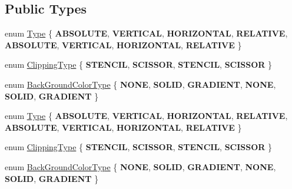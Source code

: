 \subsection*{Public Types}
\begin{DoxyCompactItemize}
\item 
enum \hyperlink{classui_1_1Layout_aecabbc1592677eadd6757edc1df5b952}{Type} \{ \newline
{\bfseries A\+B\+S\+O\+L\+U\+TE}, 
{\bfseries V\+E\+R\+T\+I\+C\+AL}, 
{\bfseries H\+O\+R\+I\+Z\+O\+N\+T\+AL}, 
{\bfseries R\+E\+L\+A\+T\+I\+VE}, 
\newline
{\bfseries A\+B\+S\+O\+L\+U\+TE}, 
{\bfseries V\+E\+R\+T\+I\+C\+AL}, 
{\bfseries H\+O\+R\+I\+Z\+O\+N\+T\+AL}, 
{\bfseries R\+E\+L\+A\+T\+I\+VE}
 \}
\item 
enum \hyperlink{classui_1_1Layout_acd2a398e83d7d467e9565d4db171c865}{Clipping\+Type} \{ {\bfseries S\+T\+E\+N\+C\+IL}, 
{\bfseries S\+C\+I\+S\+S\+OR}, 
{\bfseries S\+T\+E\+N\+C\+IL}, 
{\bfseries S\+C\+I\+S\+S\+OR}
 \}
\item 
enum \hyperlink{classui_1_1Layout_a2aad69f15823c5f22d8ed72bf2ac7472}{Back\+Ground\+Color\+Type} \{ \newline
{\bfseries N\+O\+NE}, 
{\bfseries S\+O\+L\+ID}, 
{\bfseries G\+R\+A\+D\+I\+E\+NT}, 
{\bfseries N\+O\+NE}, 
\newline
{\bfseries S\+O\+L\+ID}, 
{\bfseries G\+R\+A\+D\+I\+E\+NT}
 \}
\item 
enum \hyperlink{classui_1_1Layout_aecabbc1592677eadd6757edc1df5b952}{Type} \{ \newline
{\bfseries A\+B\+S\+O\+L\+U\+TE}, 
{\bfseries V\+E\+R\+T\+I\+C\+AL}, 
{\bfseries H\+O\+R\+I\+Z\+O\+N\+T\+AL}, 
{\bfseries R\+E\+L\+A\+T\+I\+VE}, 
\newline
{\bfseries A\+B\+S\+O\+L\+U\+TE}, 
{\bfseries V\+E\+R\+T\+I\+C\+AL}, 
{\bfseries H\+O\+R\+I\+Z\+O\+N\+T\+AL}, 
{\bfseries R\+E\+L\+A\+T\+I\+VE}
 \}
\item 
enum \hyperlink{classui_1_1Layout_acd2a398e83d7d467e9565d4db171c865}{Clipping\+Type} \{ {\bfseries S\+T\+E\+N\+C\+IL}, 
{\bfseries S\+C\+I\+S\+S\+OR}, 
{\bfseries S\+T\+E\+N\+C\+IL}, 
{\bfseries S\+C\+I\+S\+S\+OR}
 \}
\item 
enum \hyperlink{classui_1_1Layout_a2aad69f15823c5f22d8ed72bf2ac7472}{Back\+Ground\+Color\+Type} \{ \newline
{\bfseries N\+O\+NE}, 
{\bfseries S\+O\+L\+ID}, 
{\bfseries G\+R\+A\+D\+I\+E\+NT}, 
{\bfseries N\+O\+NE}, 
\newline
{\bfseries S\+O\+L\+ID}, 
{\bfseries G\+R\+A\+D\+I\+E\+NT}
 \}
\end{DoxyCompactItemize}
